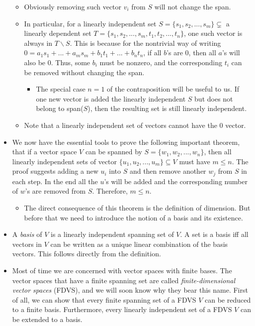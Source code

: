 \documentclass{article}
\begin{document}
\begin{itemize}
    \begin{itemize}
        \item Obviously removing such vector $v_i$ from $S$ will not change the span.
        \item In particular, for a linearly independent set $S = \{s_1, s_2, ... , s_m\} \subsetneq$ a linearly dependent set $T = \{s_1, s_2, ... , s_m, t_1, t_2, ... , t_n\}$, one such vector is always in $T \backslash S$. This is because for the nontrivial way of writing $0 = a_1s_1 + ... +a_ms_m + b_1 t_1 + ... + b_n t_n$, if all $b$'s are 0, then all $a$'s will also be 0. Thus, some $b_i$ must be nonzero, and the corresponding $t_i$ can be removed without changing the span.
        \begin{itemize}
            \item The special case $n=1$ of the contraposition will be useful to us. If one new vector is added the linearly independent $S$ but does not belong to span($S$), then the resulting set is still linearly independent.
        \end{itemize}
        \item Note that a linearly independent set of vectors cannot have the $0$ vector.
    \end{itemize}
    \item We now have the essential tools to prove the following important theorem, that if a vector space $V$ can be spanned by $S = \{w_1, w_2, ...,w_n\}$, then all linearly independent sets of vector $\{u_1,u_2,...,u_m\} \subseteq V$ must have $m \leq n$. The proof suggests adding a new $u_i$ into $S$ and then remove another $w_j$ from $S$ in each step. In the end all the $u$'s will be added and the corresponding number of $w$'s are removed from $S$. Therefore, $m \leq n$.
    \begin{itemize}
        \item The direct consequence of this theorem is the definition of dimension. But before that we need to introduce the notion of a basis and its existence.
    \end{itemize}
    \item A \textit{basis} of $V$ is a linearly independent spanning set of $V$. A set is a basis iff all vectors in $V$ can be written as a unique linear combination of the basis vectors. This follows directly from the definition.
    \item Most of time we are concerned with vector spaces with finite bases. The vector spaces that have a finite spanning set are called \textit{finite-dimensional vector spaces} (FDVS), and we will soon know why they bear this name. First of all, we can show that every finite spanning set of a FDVS $V$ can be reduced to a finite basis. Furthermore, every linearly independent set of a FDVS $V$ can be extended to a basis.

\end{itemize}
\end{document}
